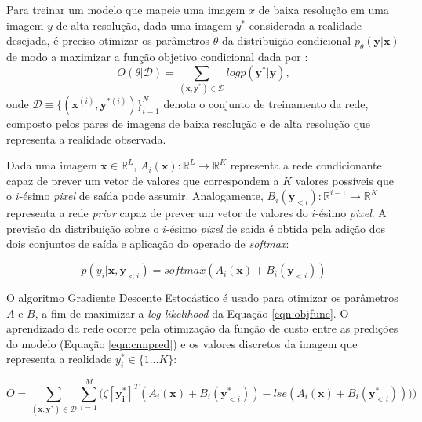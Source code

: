 Para treinar um modelo que mapeie uma imagem $x$ de baixa resolução em uma imagem $y$ de alta resolução,
dada uma imagem $y^*$ considerada a realidade desejada, é preciso otimizar os parâmetros
$\theta$ da distribuição condicional $p_{\theta}(\boldsymbol{y}|\boldsymbol{x})$ de modo
a maximizar a função objetivo condicional dada por \citep{DahlNS17}:
\begin{equation}
\label{eqn:objfunc}
O(\theta|\mathcal{D})= \sum_{(\boldsymbol{x},\boldsymbol{y^*})\in \mathcal{D}} log p(\boldsymbol{y^*}|\boldsymbol{y}),
\end{equation}
onde $\mathcal{D} \equiv \{(\boldsymbol{x}^{(i)},\boldsymbol{y}^{*(i)})\}_{i=1}^N$ denota o conjunto
de treinamento da rede, composto pelos pares de imagens de baixa resolução e de alta resolução que representa
a realidade observada.

Dada uma imagem $ \boldsymbol{x} \in \mathbb{R}^L $, $A_i(\boldsymbol{x}) : \mathbb{R}^L \rightarrow \mathbb{R}^K$
representa a rede condicionante capaz de prever um vetor de valores que correspondem a $K$ valores
possíveis que o $i$-ésimo \textit{pixel} de saída pode assumir. Analogamente,
$B_i(\boldsymbol{y}_{<i}) : \mathbb{R}^{i-1} \rightarrow \mathbb{R}^K$ representa a rede \textit{prior}
capaz de prever um vetor de valores do $i$-ésimo \textit{pixel}. A previsão da distribuição
sobre o $i$-ésimo \textit{pixel} de saída é obtida pela adição dos dois conjuntos de saída e aplicação
do operado de \textit{softmax}:

\begin{equation}
\label{eqn:cnnpred}
p(y_i|\boldsymbol{x},\boldsymbol{y}_{<i}) = softmax(A_i(\boldsymbol{x}) + B_i(\boldsymbol{y}_{<i}))
\end{equation}

O algoritmo Gradiente Descente Estocástico é usado para otimizar os parâmetros $A$ e $B$, a fim de maximizar
a \textit{log-likelihood} da Equação \ref{eqn:objfunc}. O aprendizado da rede ocorre pela otimização da função de custo entre
as predições do modelo (Equação \ref{eqn:cnnpred}) e os valores discretos da imagem que representa
a realidade $y_i^* \in \{1...K\}$:

\begin{equation}
\label{eqn:cnncostfunc}
O = \sum_{(\boldsymbol{x},\boldsymbol{y^*})\in \mathcal{D}} \sum_{i=1}^{M}\big(\zeta [\boldsymbol{y_i^*}]^T(A_i(\boldsymbol{x}) + B_i(\boldsymbol{y}_{<i}^*))
-lse(A_i(\boldsymbol{x}) + B_i(\boldsymbol{y}_{<i}^*))) \big)
\end{equation}

